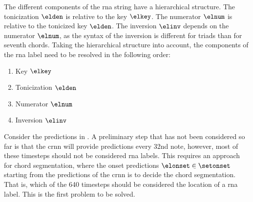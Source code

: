 The different components of the \gls{rna} string have a
hierarchical structure. The tonicization $\elden$ is
relative to the key $\elkey$. The numerator $\elnum$ is
relative to the tonicized key $\elden$. The inversion
$\elinv$ depends on the numerator $\elnum$, as the syntax of
the inversion is different for triads than for seventh
chords. Taking the hierarchical structure into account, the
components of the \gls{rna} label need to be resolved in the
following order:

\begin{enumerate}
    \item Key $\elkey$
    \item Tonicization $\elden$
    \item Numerator $\elnum$
    \item Inversion $\elinv$
\end{enumerate}

Consider the predictions in . A
preliminary step that has not been considered so far is that
the \gls{crnn} will provide predictions every \gls{32nd}
note, however, most of these timesteps should not be
considered \gls{rna} labels. This requires an approach for
chord segmentation, where the onset predictions $\elonset
\in \setonset$ starting from the predictions of the
\gls{crnn} is to decide the chord segmentation. That is,
which of the 640 timesteps should be considered the location
of a \gls{rna} label. This is the first problem to be
solved.







